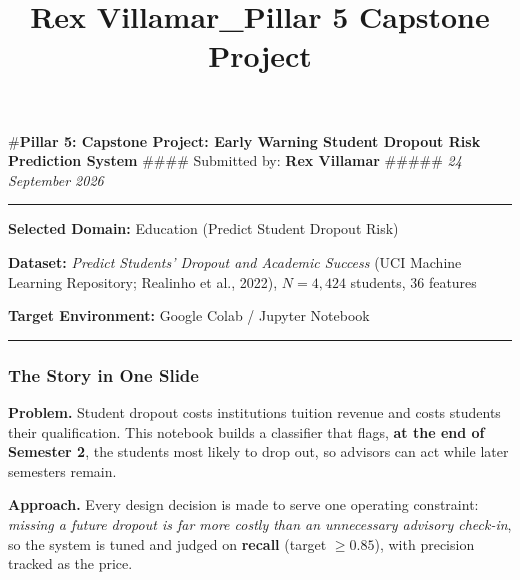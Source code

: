 \documentclass[11pt]{article}
\title{Rex Villamar\_Pillar 5 Capstone Project}
\begin{document}
    
    \maketitle
    
    

    
    \#\textbf{Pillar 5: Capstone Project: Early Warning Student Dropout Risk
Prediction System} \#\#\#\# Submitted by: \textbf{Rex Villamar}
\#\#\#\#\# \emph{24 September 2026}

\begin{center}\rule{0.5\linewidth}{0.5pt}\end{center}

\textbf{Selected Domain:} Education (Predict Student Dropout Risk)

\textbf{Dataset:} \emph{Predict Students' Dropout and Academic Success}
(UCI Machine Learning Repository; Realinho et al., 2022), \(N = 4,424\)
students, 36 features

\textbf{Target Environment:} Google Colab / Jupyter Notebook

\begin{center}\rule{0.5\linewidth}{0.5pt}\end{center}

\hypertarget{the-story-in-one-slide}{%
\subsubsection{The Story in One Slide}\label{the-story-in-one-slide}}

\textbf{Problem.} Student dropout costs institutions tuition revenue and
costs students their qualification. This notebook builds a classifier
that flags, \textbf{at the end of Semester 2}, the students most likely
to drop out, so advisors can act while later semesters remain.

\textbf{Approach.} Every design decision is made to serve one operating
constraint: \emph{missing a future dropout is far more costly than an
unnecessary advisory check-in}, so the system is tuned and judged on
\textbf{recall} (target \(\ge 0.85\)), with precision tracked as the
price.
\end{document}
